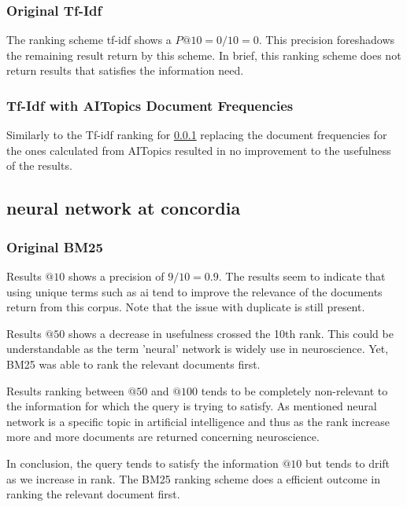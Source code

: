 \subsubsection{Original Tf-Idf}\label{query-7-tf-idf}

\par The ranking scheme tf-idf shows a $P@10=0/10=0$. This precision foreshadows the remaining result return by this scheme. In brief, this ranking scheme does not return results that satisfies the information need.

\subsubsection{Tf-Idf with AITopics Document Frequencies} \label{query-7-tf-idf-aitopics}

\par Similarly to the Tf-idf ranking for \ref{query-7-tf-idf} replacing the document frequencies for the ones calculated from AITopics resulted in no improvement to the usefulness of the results. 

\subsection{neural network at concordia}\label{query-8}

\subsubsection{Original BM25}\label{query-8-bm25}

\par Results $@10$ shows a precision of $9/10=0.9$. The results seem to indicate that using unique terms such as ai tend to improve the relevance of the documents return from this corpus. Note that the issue with duplicate is still present.
\par Results $@50$ shows a decrease in usefulness crossed the 10th rank. This could be understandable as the term 'neural' network is widely use in neuroscience. Yet, BM25 was able to rank the relevant documents first.
\par Results ranking between $@50$ and $@100$ tends to be completely non-relevant to the information for which the query is trying to satisfy. As mentioned neural network is a specific topic in artificial intelligence and thus as the rank increase more and more documents are returned concerning neuroscience. 
\par In conclusion, the query tends to satisfy the information $@10$ but tends to drift as we increase in rank. The BM25 ranking scheme does a efficient outcome in ranking the relevant document first.


